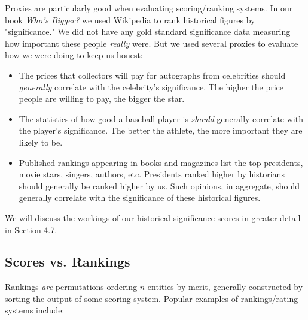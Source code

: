 \documentclass[10pt]{article}
\begin{document}
Proxies are particularly good when evaluating scoring/ranking systems. In our book \textit{Who's Bigger?} \cite{SW13} we used Wikipedia to rank historical figures by "significance." We did not have any gold standard significance data measuring how important these people \textit{really} were. But we used several proxies to evaluate how we were doing to keep us honest:

\begin{itemize}
  \item The prices that collectors will pay for autographs from celebrities should \textit{generally} correlate with the celebrity's significance. The higher the price people are willing to pay, the bigger the star.
\end{itemize}





\begin{itemize}
    \item The statistics of how good a baseball player is \textit{should} generally correlate with the player's significance. The better the athlete, the more important they are likely to be.
    \item Published rankings appearing in books and magazines list the top presidents, movie stars, singers, authors, etc. Presidents ranked higher by historians should generally be ranked higher by us. Such opinions, in aggregate, should generally correlate with the significance of these historical figures.
\end{itemize}

We will discuss the workings of our historical significance scores in greater detail in Section 4.7.

\subsection{Scores vs. Rankings}
Rankings \textit{are} permutations ordering $n$ entities by merit, generally constructed by sorting the output of some scoring system. Popular examples of rankings/rating systems include:
\end{document}
